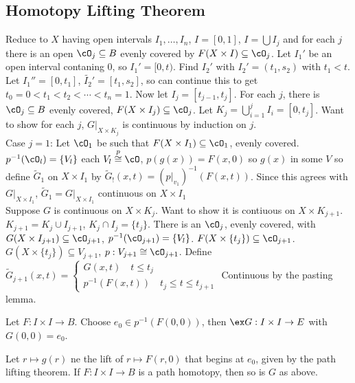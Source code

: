 
\subsection{Homotopy Lifting Theorem}

\begin{pf}
    Reduce to $X$ having open intervals $I_1, \ldots, I_n$, $I = [0,1]$, $I = \bigcup I_j$ and for each $j$ there is an open $\cO_j \subseteq B$ evenly covered by $F(X \times I) \subseteq \cO_j$. Let $I_1'$ be an open interval contaning 0, so $ I_1' = [0,t)$. Find $I_2'$ with $I_2' = (t_1, s_2)$ with $t_1 < t$. Let $I_1'' = [0,t_1]$, $\tilde{I_2}' = [t_1, s_2]$, so can continue this to get $t_0 = 0 < t_1 < t_2 < \cdots < t_n = 1$. Now let $I_j = [t_{j-1}, t_j]$. For each $j$, there is $\cO_j \subseteq B$ evenly covered, $F(X \times I_j) \subseteq \cO_j$. Let $K_j = \bigcup_{i=1}^j I_i = [0, t_j]$. Want to show for each $j$, $G|_{X \times K_j}$ is continuous by induction on $j$. \\
    Case $j=1$: Let $\cO_1$ be such that $F(X \times I_1) \subseteq \cO_1$, evenly covered. $p^{-1}(\cO_l) = \{V_l\}$ each $V_l \stackrel{p}{\cong} \cO$, $p(g(x)) = F(x,0)$ so $g(x)$ in some $V$ so define $\tilde{G}_1$ on $X \times I_1$ by $\tilde{G}_!(x, t) = (p|_{v_1})^{-1}(F(x,t))$. Since this agrees with $G|_{X \times I_1}$, $\tilde{G}_1 = G|_{X \times I_1}$ continuous on $X \times I_1$ \\
    Suppose $G$ is continuous on $X \times K_j$. Want to show it is contiuous on $X \times K_{j+1}$. $K_{j+1} = K_j \cup I_{j+1}$, $K_j \cap I_j = \{t_j\}$. There is an $\cO_j$, evenly covered, with $G(X \times I_{j+1}) \subseteq \cO_{j+1}$, $p^{-1}(\cO_{j+1}) = \{V_l\}$. $F(X \times \{t_j\}) \subseteq \cO_{j+1}$. $G(X \times \{t_j\}) \subseteq V_{j+1}$, $p: V_{j+1} \cong \cO_{j+1}$. Define $\tilde{G}_{j+1}(x,t) = \begin{cases} G(x,t) \quad t \le t_{j} \\ p^{-1}(F(x,t)) \quad t_{j} \le t \le t_{j+1}
    \end{cases}$ Continuous by the pasting lemma. 
\end{pf}

\begin{corollary}
    Let $F: I \times I \to B$. Choose $e_0 \in p^{-1}(F(0,0))$, then $\ex G: I \times I \to E$ with $G(0,0)=e_0$.
\end{corollary}

\begin{theorem}
    Let $r \mapsto g(r)$ ne the lift of $r \mapsto F(r,0)$ that begins at $e_0$, given by the path lifting theorem. If $F: I \times I \to B$ is a path homotopy, then so is $G$ as above.   
\end{theorem}